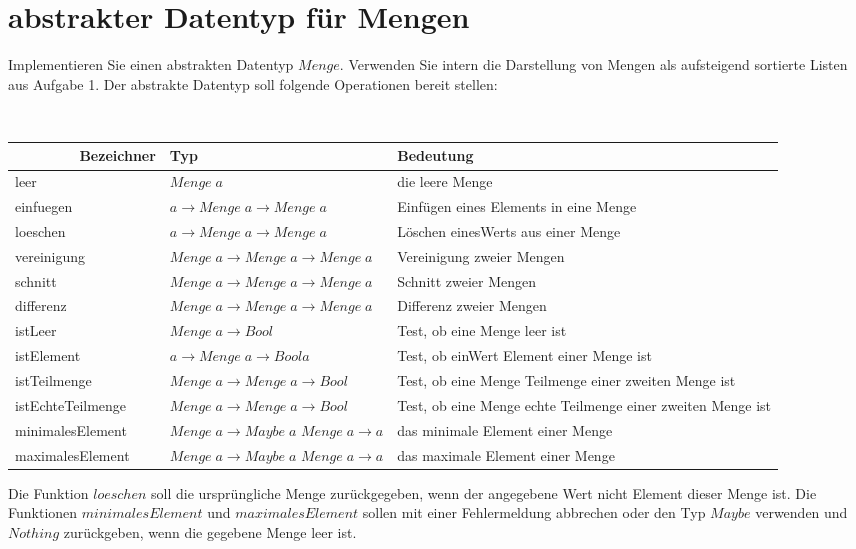\documentclass{article}
\begin{document}
\section{abstrakter Datentyp für Mengen}
Implementieren Sie einen abstrakten Datentyp $Menge$. Verwenden Sie intern die Darstellung
von Mengen als aufsteigend sortierte Listen aus Aufgabe 1.
Der abstrakte Datentyp soll folgende Operationen bereit stellen:

\begin{table}[H]
    \begin{tabular}{lp{5.5cm}p{6.5cm}} %
        Bezeichner & Typ & Bedeutung         \\ \hline
		leer & $Menge\;a$ & die leere Menge \\
		einfuegen & $a \to Menge\;a \to Menge\;a$ & Einfügen eines Elements in eine Menge\\
		loeschen & $a \to Menge\;a \to Menge\;a$ & Löschen einesWerts aus einer Menge\\
		vereinigung & $Menge\;a \to Menge\;a \to Menge\;a$ & Vereinigung zweier Mengen\\
		schnitt & $Menge\;a \to Menge\;a \to Menge\;a$ & Schnitt zweier Mengen\\
		differenz & $Menge\;a \to Menge\;a \to Menge\;a$ & Differenz zweier Mengen\\
		istLeer & $Menge\;a \to Bool$ & Test, ob eine Menge leer ist\\
		istElement & $a \to Menge\;a \to Boola$ & Test, ob einWert Element einer Menge ist\\
		istTeilmenge & $Menge\;a \to Menge\;a \to Bool$ & Test, ob eine Menge Teilmenge einer \newline zweiten Menge ist\\
		istEchteTeilmenge & $Menge\;a \to Menge\;a \to Bool$ & Test, ob eine Menge echte Teilmenge einer \newline zweiten Menge ist\\
		minimalesElement & $Menge\;a \to Maybe\;a$ \newline $Menge\;a \to a$ & das minimale Element einer Menge\\
		maximalesElement & $Menge\;a \to Maybe\;a$ \newline $Menge\;a \to a$ & das maximale Element einer Menge
	\end{tabular}	
\end{table}
Die Funktion $loeschen$ soll die ursprüngliche Menge zurückgegeben, wenn der angegebene
Wert nicht Element dieser Menge ist. Die Funktionen $minimalesElement$ und
$maximalesElement$ sollen mit einer Fehlermeldung abbrechen oder den Typ $Maybe$ verwenden und $Nothing$ zurückgeben, wenn die gegebene Menge
leer ist.
\end{document}
